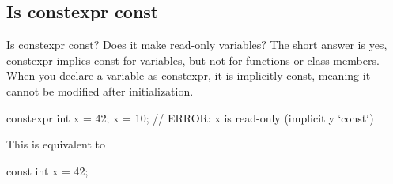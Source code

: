 \documentclass{report}
\begin{document}
\bigbreak \noindent 
\subsection{Is constexpr const}
\bigbreak \noindent 
Is constexpr const? Does it make read-only variables? The short answer is yes, constexpr implies const for variables, but not for functions or class members.
\bigbreak \noindent 
When you declare a variable as constexpr, it is implicitly const, meaning it cannot be modified after initialization.
\bigbreak \noindent 
\begin{cppcode}
constexpr int x = 42;
x = 10;  // ERROR: x is read-only (implicitly `const`)
\end{cppcode}
\bigbreak \noindent 
This is equivalent to 
\bigbreak \noindent 
\begin{cppcode}
const int x = 42;
\end{cppcode}

\bigbreak \noindent 
\end{document}
